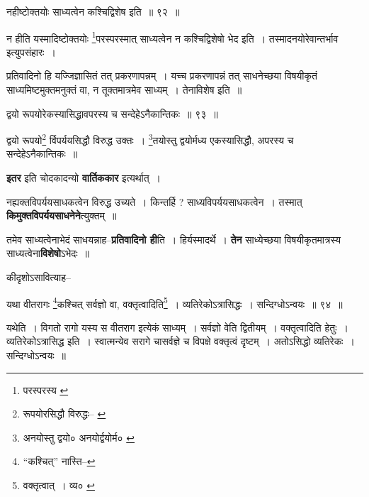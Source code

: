 \documentclass[article,12pt,a4paper]{memoir}
\begin{document}
	  \bigskip
	  \begingroup
	

	  \pstart नहीष्टोक्तयोः साध्यत्वेन कश्चिद्विशेष इति ॥ ९२ ॥
	\pend
      
	  \endgroup
	 

	  \pstart न हीति यस्मादिष्टोक्तयोः \footnote{परस्परस्य \cite{dp-msD} \cite{dp-msB} \cite{dp-edP} \cite{dp-edH} \cite{dp-edE}}\-परस्परस्मात् साध्यत्वेन न कश्चिद्विशेषो भेद इति । तस्मादनयोरेवान्तर्भाव इत्युपसंहारः ।
	\pend
       

	  \pstart प्रतिवादिनो हि यज्जिज्ञासितं तत् प्रकरणापन्नम् । यच्च प्रकरणापन्नं तत् साधनेच्छया विषयीकृतं साध्यमिष्टमुक्तमनुक्तं वा, न तूक्तमात्रमेव साध्यम् । तेनाविशेष इति ॥
	\pend
       
	  \bigskip
	  \begingroup
	

	  \pstart द्वयो रूपयोरेकस्यासिद्धावपरस्य च सन्देहेऽनैकान्तिकः ॥ ९३ ॥
	\pend
      
	  \endgroup
	 

	  \pstart द्वयो रूपयो\footnote{रूपयोरसिद्धौ विरुद्धः--\cite{dp-msA} \cite{dp-msB} \cite{dp-msC} \cite{dp-msD} \cite{dp-edP} \cite{dp-edH} \cite{dp-edN}} र्विपर्ययसिद्धौ विरुद्ध उक्तः । \footnote{अनयोस्तु द्वयो० \cite{dp-msD} अनयोर्द्वयोर्म० \cite{dp-msA} \cite{dp-msB} \cite{dp-edP} \cite{dp-edH} \cite{dp-edE} \cite{dp-edN}}\-तयोस्तु द्वयोर्मध्य एकस्यासिद्धौ, अपरस्य च सन्देहेऽनैकान्तिकः ॥
	\pend
      
	  \endgroup
	

	  \pstart \textbf{इतर} इति चोदकादन्यो \textbf{वार्तिककार} इत्यर्थात् ।
	\pend
      

	  \pstart नह्यक्तविपर्ययसाधकत्वेन विरुद्ध उच्यते । किन्तर्हि ? साध्यविपर्ययसाधकत्वेन । तस्मात् \textbf{किमुक्तविपर्ययसाधनेने}त्युक्तम् ॥
	\pend
      

	  \pstart तमेव साध्यत्वेनाभेदं साधयन्नाह--\textbf{प्रतिवादिनो ही}ति । हिर्यस्मादर्थे । \textbf{तेन} साध्येच्छया विषयीकृतमात्रस्य साध्यत्वेना\textbf{विशेषो}ऽभेदः ॥
	\pend
	  \bigskip
	  \begingroup
	

	  \pstart कीदृशोऽसावित्याह--
	\pend
       
	  \bigskip
	  \begingroup
	

	  \pstart यथा वीतरागः \footnote{“कश्चित्” नास्ति--\cite{dp-msC}}\-कश्चित् सर्वज्ञो वा, वक्तृत्वादिति\footnote{वक्तृत्वात् । व्य० \cite{dp-msC}} । व्यतिरेकोऽत्रासिद्धः । सन्दिग्धोऽन्वयः ॥ ९४ ॥
	\pend
      
	  \endgroup
	 

	  \pstart यथेति । विगतो रागो यस्य स वीतराग इत्येकं साध्यम् । सर्वज्ञो वेति द्वितीयम् । वक्तृत्वादिति हेतुः । व्यतिरेकोऽत्रासिद्ध इति । स्वात्मन्येव सरागे चासर्वज्ञे च विपक्षे वक्तृत्वं दृष्टम् । अतोऽसिद्धो व्यतिरेकः । सन्दिग्धोऽन्वयः ॥
	\pend
       
\end{document}
